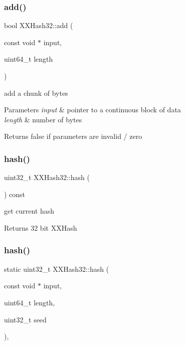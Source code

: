 \subsubsection{\texorpdfstring{add()}{add()}}
{\footnotesize\ttfamily bool X\+X\+Hash32\+::add (\begin{DoxyParamCaption}\item[{const void $\ast$}]{input,  }\item[{uint64\+\_\+t}]{length }\end{DoxyParamCaption})\hspace{0.3cm}{\ttfamily [inline]}}



add a chunk of bytes 


\begin{DoxyParams}{Parameters}
{\em input} & pointer to a continuous block of data \\
\hline
{\em length} & number of bytes \\
\hline
\end{DoxyParams}
\begin{DoxyReturn}{Returns}
false if parameters are invalid / zero 
\end{DoxyReturn}
\mbox{\label{class_x_x_hash32_ae5ceaf0d3cd6e4a4b4fca4245dc0a580}} 
\subsubsection{\texorpdfstring{hash()}{hash()}\hspace{0.1cm}{\footnotesize\ttfamily [1/2]}}
{\footnotesize\ttfamily uint32\+\_\+t X\+X\+Hash32\+::hash (\begin{DoxyParamCaption}{ }\end{DoxyParamCaption}) const\hspace{0.3cm}{\ttfamily [inline]}}



get current hash 

\begin{DoxyReturn}{Returns}
32 bit X\+X\+Hash 
\end{DoxyReturn}
\mbox{\label{class_x_x_hash32_a3a64c1cc13fa09e42209d23260128c16}} 
\subsubsection{\texorpdfstring{hash()}{hash()}\hspace{0.1cm}{\footnotesize\ttfamily [2/2]}}
{\footnotesize\ttfamily static uint32\+\_\+t X\+X\+Hash32\+::hash (\begin{DoxyParamCaption}\item[{const void $\ast$}]{input,  }\item[{uint64\+\_\+t}]{length,  }\item[{uint32\+\_\+t}]{seed }\end{DoxyParamCaption})\hspace{0.3cm}{\ttfamily [inline]}, {\ttfamily [static]}}



